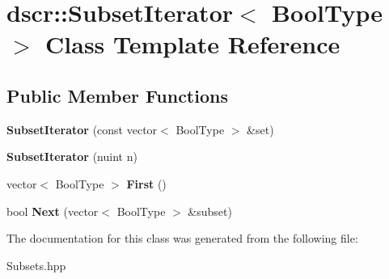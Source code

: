 \hypertarget{classdscr_1_1_subset_iterator}{\section{dscr\-:\-:Subset\-Iterator$<$ Bool\-Type $>$ Class Template Reference}
\label{classdscr_1_1_subset_iterator}
}
\subsection*{Public Member Functions}
\begin{DoxyCompactItemize}
\item 
\hypertarget{classdscr_1_1_subset_iterator_aa19a9f33e16a59c6335f739c0c74a80a}{{\bfseries Subset\-Iterator} (const vector$<$ Bool\-Type $>$ \&set)}\label{classdscr_1_1_subset_iterator_aa19a9f33e16a59c6335f739c0c74a80a}

\item 
\hypertarget{classdscr_1_1_subset_iterator_adcac1ef2d336f77382d937d5bb3346a2}{{\bfseries Subset\-Iterator} (nuint n)}\label{classdscr_1_1_subset_iterator_adcac1ef2d336f77382d937d5bb3346a2}

\item 
\hypertarget{classdscr_1_1_subset_iterator_a71430e63dce3a0f601df446cdcb23d1a}{vector$<$ Bool\-Type $>$ {\bfseries First} ()}\label{classdscr_1_1_subset_iterator_a71430e63dce3a0f601df446cdcb23d1a}

\item 
\hypertarget{classdscr_1_1_subset_iterator_a0385eee20ec7ed7a43ce17fc6a2c4348}{bool {\bfseries Next} (vector$<$ Bool\-Type $>$ \&subset)}\label{classdscr_1_1_subset_iterator_a0385eee20ec7ed7a43ce17fc6a2c4348}

\end{DoxyCompactItemize}


The documentation for this class was generated from the following file\-:\begin{DoxyCompactItemize}
\item 
Subsets.\-hpp\end{DoxyCompactItemize}
